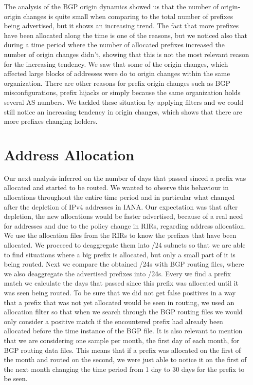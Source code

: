 \documentclass[11pt,a4paper]{scrreprt}
\begin{document}
The analysis of the BGP origin dynamics showed us that the number of origin-origin changes is quite small when comparing to the total number of prefixes being advertised, but it shows an increasing trend. The fact that more prefixes have been allocated along the time is one of the reasons, but we noticed also that during a time period where the number of allocated prefixes increased the number of origin changes didn't, showing that this is not the most relevant reason for the increasing tendency. We saw that some of the origin changes, which affected large blocks of addresses were do to origin changes within the same organization. There are other reasons for prefix origin changes such as BGP misconfigurations, prefix hijacks or simply because the same organization holds several AS numbers. We tackled these situation by applying filters and we could still notice an increasing tendency in origin changes, which shows that there are more prefixes changing holders.


\section{Address Allocation}

Our next analysis inferred on the number of days that passed sinced a prefix was allocated and started to be routed. We wanted to observe this behaviour in allocations throughout the entire time period and in particular what changed after the depletion of IPv4 addresses in IANA. Our expectation was that after depletion, the new allocations would be faster advertised, because of a real need for addresses and due to the policy change in RIRs, regarding address allocation.
We use the allocation files from the RIRs to know the prefixes that have been allocated. We procceed to deaggregate them into /24 subnets so that we are able to find situations where a big prefix is allocated, but only a small part of it is being routed. Next we compare the obtained /24s with BGP routing files, where we also deaggregate the advertised prefixes into /24s. Every we find a prefix match we calculate the days that passed since this prefix was allocated until it was seen being routed. To be sure that we did not get false positives in a way that a prefix that was not yet allocated would be seen in routing, we used an allocation filter so that when we search through the BGP routing files we would only consider a positive match if the encountered prefix had already been allocated before the time instance of the BGP file. It is also relevant to mention that we are considering one sample per month, the first day of each month, for BGP routing data files. This means that if a prefix was allocated on the first of the month and routed on the second, we were just able to notice it on the first of the next month changing the time period from 1 day to 30 days for the prefix to be seen.  
\end{document}
